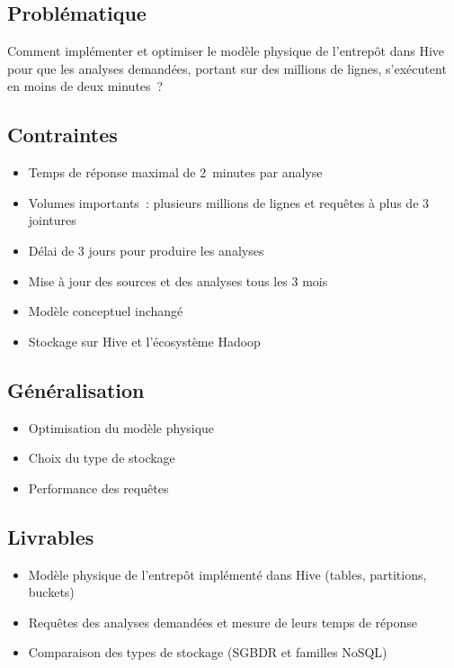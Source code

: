 \subsection*{Problématique}
{}
\noindent Comment implémenter et optimiser le modèle physique de l'entrepôt dans Hive pour que les analyses demandées, portant sur des millions de lignes, s'exécutent en moins de deux minutes~?

\subsection*{Contraintes}
{}
\begin{itemize}
	\item Temps de réponse maximal de 2~minutes par analyse
	\item Volumes importants~: plusieurs millions de lignes et requêtes à plus de 3 jointures
	\item Délai de 3 jours pour produire les analyses
	\item Mise à jour des sources et des analyses tous les 3 mois
	\item Modèle conceptuel inchangé
	\item Stockage sur Hive et l'écosystème Hadoop
\end{itemize}

\subsection*{Généralisation}
{}
\begin{itemize}
	\item Optimisation du modèle physique
	\item Choix du type de stockage
	\item Performance des requêtes
\end{itemize}

\subsection*{Livrables}
{}
\begin{itemize}
	\item Modèle physique de l'entrepôt implémenté dans Hive (tables, partitions, buckets)
	\item Requêtes des analyses demandées et mesure de leurs temps de réponse
	\item Comparaison des types de stockage (SGBDR et familles NoSQL)
\end{itemize}

